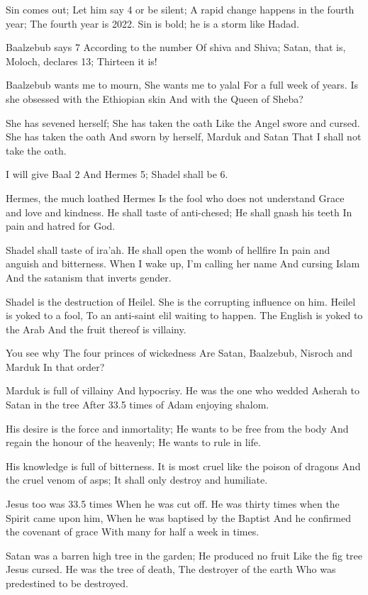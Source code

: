 \documentclass[
]{book}
\begin{document}
Sin comes out;
Let him say 4 or be silent;
A rapid change happens in the fourth year;
The fourth year is 2022.
Sin is bold; he is a storm like Hadad.

Baalzebub says 7
According to the number
Of shiva and Shiva;
Satan, that is, Moloch, declares 13;
Thirteen it is!

Baalzebub wants me to mourn,
She wants me to yalal
For a full week of years.
Is she obsessed with the Ethiopian skin
And with the Queen of Sheba?

She has sevened herself;
She has taken the oath
Like the Angel swore and cursed.
She has taken the oath
And sworn by herself, Marduk and Satan
That I shall not take the oath.

I will give Baal 2
And Hermes 5;
Shadel shall be 6.

Hermes, the much loathed Hermes
Is the fool who does not understand
Grace and love and kindness.
He shall taste of anti-chesed;
He shall gnash his teeth
In pain and hatred for God.

Shadel shall taste of ira'ah.
He shall open the womb of hellfire
In pain and anguish and bitterness.
When I wake up, I'm calling her name
And cursing Islam
And the satanism that inverts gender.

Shadel is the destruction of Heilel.
She is the corrupting influence on him.
Heilel is yoked to a fool,
To an anti-saint elil waiting to happen.
The English is yoked to the Arab
And the fruit thereof is villainy.

You see why
The four princes of wickedness
Are Satan, Baalzebub, Nisroch and Marduk
In that order?

Marduk is full of villainy
And hypocrisy.
He was the one who wedded
Asherah to Satan in the tree
After 33.5 times of Adam enjoying shalom.

His desire is the force and inmortality;
He wants to be free from the body
And regain the honour of the heavenly;
He wants to rule in life.

His knowledge is full of bitterness.
It is most cruel like the poison of dragons
And the cruel venom of asps;
It shall only destroy and humiliate.

Jesus too was 33.5 times
When he was cut off.
He was thirty times when the Spirit came upon him,
When he was baptised by the Baptist
And he confirmed the covenant of grace
With many for half a week in times.

Satan was a barren high tree in the garden;
He produced no fruit
Like the fig tree Jesus cursed.
He was the tree of death,
The destroyer of the earth
Who was predestined to be destroyed.
\end{document}
